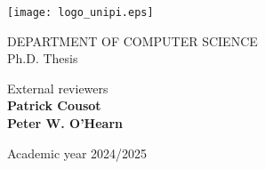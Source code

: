 \begin{titlepage}
	\begin{center}
		\texttt{[image: logo\_unipi.eps]}

		\vspace{1cm}
		\large
		\MakeUppercase{Department of Computer Science}\\
		\vspace{0.4cm}
		{Ph.D. Thesis}

		\vspace{2.5cm}
		\LARGE
		\textbf{\thesistitle}

		\vspace{3cm}
		\Large
		\peopleheader
		\textbf{\authornamefl} \hfill \textbf{\supervisors}

		\vspace{1.5ex}
		{\hfill External reviewers \\}
		\textbf{\hfill Patrick Cousot \\ \hfill Peter W. O'Hearn}

		\vfill
		\large
		{Academic year 2024/2025}
	\end{center}
\end{titlepage}
